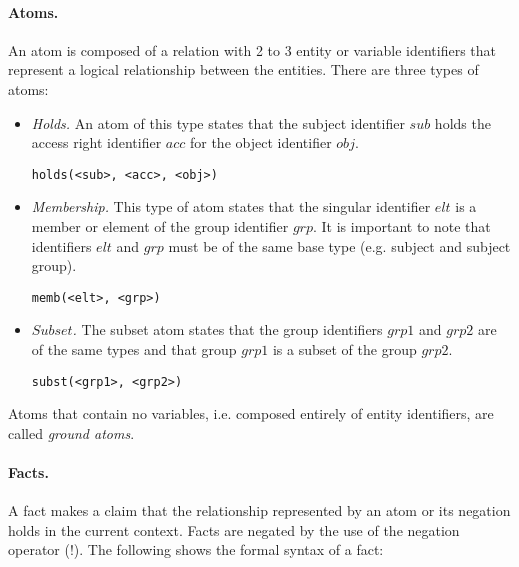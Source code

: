 \documentclass[10pt, twocolumn]{article}
\begin{document}
        \paragraph{Atoms.}
          An atom is composed of a relation with 2 to 3 entity or variable
          identifiers that represent a logical relationship between the
          entities. There are three types of atoms:

          \begin{itemize}
            \item
              {\em Holds.} An atom of this type states that the subject
              identifier $sub$ holds the access right identifier $acc$
              for the object identifier $obj$.

              \begin{verbatim}holds(<sub>, <acc>, <obj>)\end{verbatim}
            \item
              {\em Membership.} This type of atom states that the singular
              identifier $elt$ is a member or element of the group identifier
              $grp$. It is important to note that identifiers $elt$ and $grp$
              must be of the same base type (e.g. subject and subject group).

              \begin{verbatim}memb(<elt>, <grp>)\end{verbatim}
            \item
              {\em $Subset$.} The subset atom states that the group identifiers
              $grp1$ and $grp2$ are of the same types and that group $grp1$ is
              a subset of the group $grp2$.

              \begin{verbatim}subst(<grp1>, <grp2>)\end{verbatim}
          \end{itemize}

          Atoms that contain no variables, i.e. composed entirely of entity
          identifiers, are called {\em ground atoms}.

        \paragraph{Facts.}
          A fact makes a claim that the relationship represented by an atom or
          its negation holds in the current context. Facts are negated by the
          use of the negation operator ($!$). The following shows the formal
          syntax of a fact:
\end{document}
